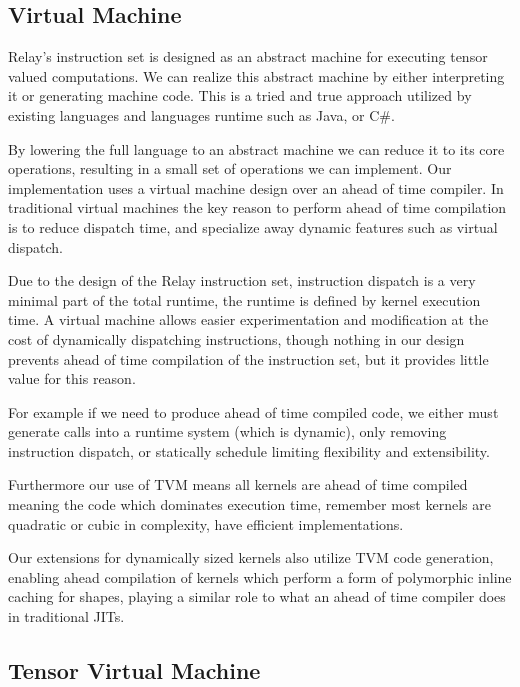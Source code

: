 \subsection{Virtual Machine}
\label{sec:vm}

Relay's instruction set is designed as an abstract machine for executing tensor valued
computations. We can realize this abstract machine by either interpreting it or generating
machine code. This is a tried and true approach utilized by existing languages and languages
runtime such as Java, or C\#.

By lowering the full language to an abstract machine we can reduce it to its core operations,
resulting in a small set of operations we can implement. Our implementation uses a virtual
machine design over an ahead of time compiler. In traditional virtual machines the key
reason to perform ahead of time compilation is to reduce dispatch time, and specialize
away dynamic features such as virtual dispatch.

Due to the design of the Relay instruction set, instruction dispatch is a very minimal
part of the total runtime, the runtime is defined by kernel execution time.
A virtual machine allows easier experimentation and modification at the cost of dynamically
dispatching instructions, though nothing in our design prevents ahead of time compilation
of the instruction set, but it provides little value for this reason.

For example if we need to produce ahead of time
compiled code, we either must generate calls into a runtime system (which is dynamic),
only removing instruction dispatch, or statically schedule limiting flexibility and
extensibility.

Furthermore our use of TVM means all kernels are ahead of time compiled meaning the
code which dominates execution time, remember most kernels are quadratic or cubic in
complexity, have efficient implementations.

Our extensions for dynamically sized kernels also utilize TVM code generation, enabling
ahead compilation of kernels which perform a form of polymorphic inline caching for shapes,
playing a similar role to what an ahead of time compiler does in traditional JITs.



\subsection{Tensor Virtual Machine}

